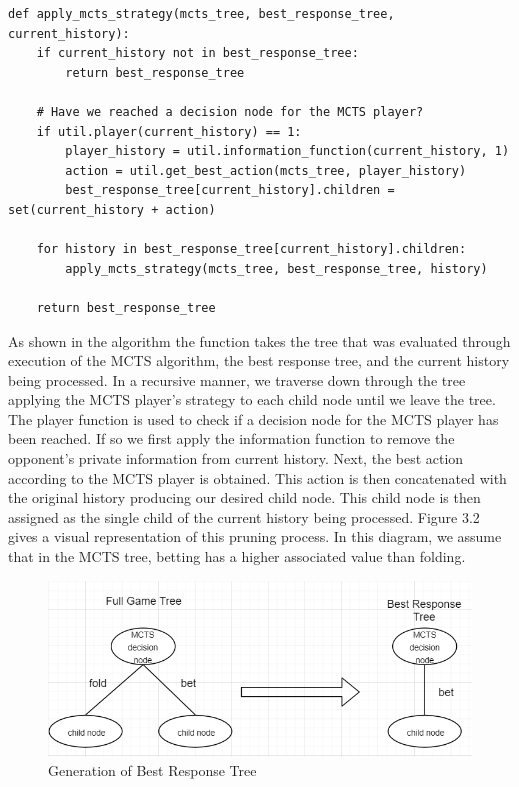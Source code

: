 \begin{lstlisting}[style=Python]
def apply_mcts_strategy(mcts_tree, best_response_tree, current_history):
    if current_history not in best_response_tree:
        return best_response_tree

    # Have we reached a decision node for the MCTS player?
    if util.player(current_history) == 1:
        player_history = util.information_function(current_history, 1)
        action = util.get_best_action(mcts_tree, player_history)
        best_response_tree[current_history].children = set(current_history + action)

    for history in best_response_tree[current_history].children:
        apply_mcts_strategy(mcts_tree, best_response_tree, history)

    return best_response_tree
\end{lstlisting}

As shown in the algorithm the function takes the tree that was evaluated
through execution of the MCTS algorithm, the best response tree, and the current history being processed.
In a recursive manner, we traverse down through the tree applying the MCTS player's
strategy to each child node until we leave the tree.
The player function is used to check if a decision node for the MCTS player has been reached.
If so we first apply the information function to remove the opponent's private information from current history.
Next, the best action according to the MCTS player is obtained.
This action is then concatenated with the original history producing our desired child node.
This child node is then assigned as the single child of the current history being processed.
Figure 3.2 gives a visual representation of this pruning process.
In this diagram, we assume that in the MCTS tree, betting has a higher associated value than folding.

\begin{figure}[!ht]
    \includegraphics[scale=1]{images/best_response_tree_vs_full_tree.PNG}
    \caption{Generation of Best Response Tree}
\end{figure}

